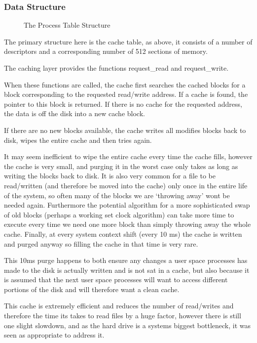\documentclass[a4paper]{report}
\begin{document}
\subsubsection{Data Structure}

\begin{figure}[ht]
  \centering

  \def\svgwidth{\columnwidth}
  
  \caption{The Process Table Structure}
  \label{fig:schedulerscreen}
\end{figure}

The primary structure here is the cache table, as above, it consists of a number of descriptors and a corresponding number of 512 sections of memory.

The caching layer provides the functions request_read and request_write.

When these functions are called, the cache first searches the cached blocks for a block corresponding to the requested read/write address. If a cache is found, the pointer to this block is returned. If there is no cache for the requested address, the data is off the disk into a new cache block.

If there are no new blocks available, the cache writes all modifies blocks back to disk, wipes the entire cache and then tries again.

It may seem inefficient to wipe the entire cache every time the cache fills, however the cache is very small, and purging it in the worst case only takes as long as writing the blocks back to disk. It is also very common for a file to be read/written (and therefore be moved into the cache) only once in the entire life of the system, so often many of the blocks we are `throwing away' wont be needed again. Furthermore the potential algorithm for a more sophisticated swap of old blocks (perhaps a working set clock algorithm) can take more time to execute every time we need one more block than simply throwing away the whole cache. Finally, at every system context shift (every 10 ms) the cache is written and purged anyway so filling the cache in that time is very rare.

This 10ms purge happens to both ensure any changes a user space processes has made to the disk is actually written and is not sat in a cache, but also because it is assumed that the next user space processes will want to access different portions of the disk and will therefore want a clean cache.

This cache is extremely efficient and reduces the number of read/writes and therefore the time its takes to read files by a huge factor, however there is still one slight slowdown, and as the hard drive is a systems biggest bottleneck, it was seen as appropriate to address it.
\end{document}
